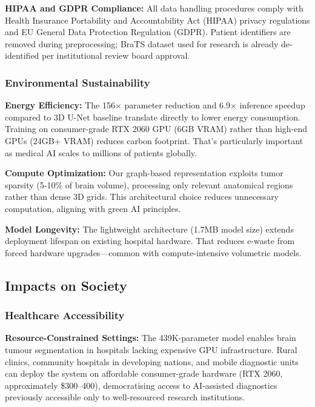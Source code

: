 \textbf{HIPAA and GDPR Compliance:} All data handling procedures comply with Health Insurance Portability and Accountability Act (HIPAA) privacy regulations and EU General Data Protection Regulation (GDPR). Patient identifiers are removed during preprocessing; BraTS dataset used for research is already de-identified per institutional review board approval.

\subsubsection{Environmental Sustainability}

\textbf{Energy Efficiency:} The 156$\times$ parameter reduction and 6.9$\times$ inference speedup compared to 3D U-Net baseline translate directly to lower energy consumption. Training on consumer-grade RTX 2060 GPU (6GB VRAM) rather than high-end GPUs (24GB+ VRAM) reduces carbon footprint. That's particularly important as medical AI scales to millions of patients globally.

\textbf{Compute Optimization:} Our graph-based representation exploits tumor sparsity (5-10\% of brain volume), processing only relevant anatomical regions rather than dense 3D grids. This architectural choice reduces unnecessary computation, aligning with green AI principles.

\textbf{Model Longevity:} The lightweight architecture (1.7MB model size) extends deployment lifespan on existing hospital hardware. That reduces e-waste from forced hardware upgrades—common with compute-intensive volumetric models.


\subsection{Impacts on Society}

\subsubsection{Healthcare Accessibility}

\textbf{Resource-Constrained Settings:} The 439K-parameter model enables brain tumour segmentation in hospitals lacking expensive GPU infrastructure. Rural clinics, community hospitals in developing nations, and mobile diagnostic units can deploy the system on affordable consumer-grade hardware (RTX 2060, approximately \$300--400), democratising access to AI-assisted diagnostics previously accessible only to well-resourced research institutions.


